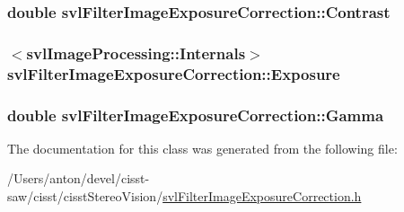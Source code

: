 \subsubsection[{Contrast}]{\setlength{\rightskip}{0pt plus 5cm}double svl\+Filter\+Image\+Exposure\+Correction\+::\+Contrast\hspace{0.3cm}{\ttfamily [protected]}}\label{classsvl_filter_image_exposure_correction_a9dea6bb5e12150a39cc0c68b7688a099}
\hypertarget{classsvl_filter_image_exposure_correction_ad9a373e1d45905e9ce684d07985f5b41}{}
\subsubsection[{Exposure}]{$<${\bf svl\+Image\+Processing\+::\+Internals}$>$ svl\+Filter\+Image\+Exposure\+Correction\+::\+Exposure\hspace{0.3cm}{\ttfamily [protected]}}\label{classsvl_filter_image_exposure_correction_ad9a373e1d45905e9ce684d07985f5b41}
\hypertarget{classsvl_filter_image_exposure_correction_a0bda9bde283f1fd9dc89780fc38f5eeb}{}
\subsubsection[{Gamma}]{\setlength{\rightskip}{0pt plus 5cm}double svl\+Filter\+Image\+Exposure\+Correction\+::\+Gamma\hspace{0.3cm}{\ttfamily [protected]}}\label{classsvl_filter_image_exposure_correction_a0bda9bde283f1fd9dc89780fc38f5eeb}


The documentation for this class was generated from the following file\+:\begin{DoxyCompactItemize}
\item 
/\+Users/anton/devel/cisst-\/saw/cisst/cisst\+Stereo\+Vision/\hyperlink{svl_filter_image_exposure_correction_8h}{svl\+Filter\+Image\+Exposure\+Correction.\+h}\end{DoxyCompactItemize}
